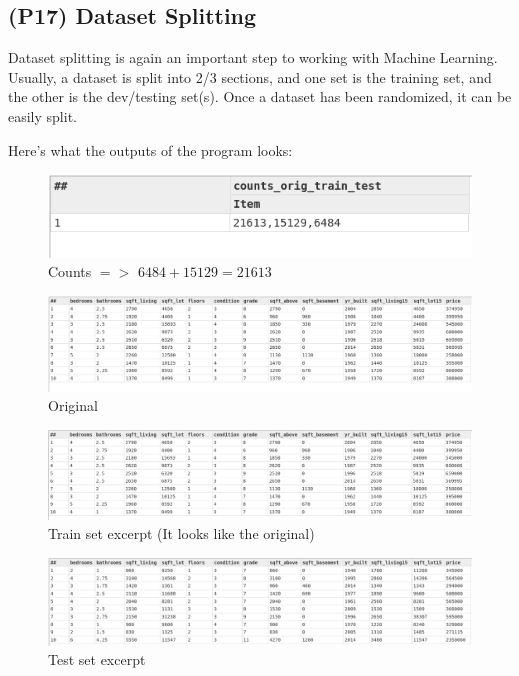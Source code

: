 \documentclass[a4paper,oneside,12pt]{book}
\begin{document}
\subsection[Dataset Splitting]{(P17) Dataset Splitting}

Dataset splitting is again an important step to working with Machine Learning. Usually, a dataset is split into 2/3 sections, and one set is the training set, and the other is the dev/testing set(s). Once a dataset has been randomized, it can be easily split.



Here's what the outputs of the program looks:

\begin{figure}[h]
    \centering
    \includegraphics[width=.7\linewidth]{../output/55/counts}
    \caption{Counts $=>$ $6484+15129=21613$}
\end{figure}

\begin{figure}[h]
    \centering
    \includegraphics[width=\linewidth]{../output/55/original}
    \caption{Original}
\end{figure}

\begin{figure}[h]
    \centering
    \includegraphics[width=\linewidth]{../output/55/train}
    \caption{Train set excerpt (It looks like the original)}
\end{figure}

\begin{figure}[h]
    \centering
    \includegraphics[width=\linewidth]{../output/55/test}
    \caption{Test set excerpt}
\end{figure}
\end{document}
